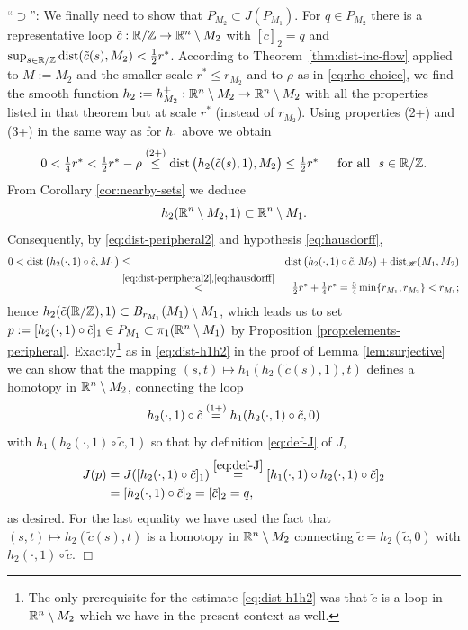 ``$\supset$'':
We finally need to show that $P_{M_2}\subset J(P_{M_1})$. For $q\in P_{M_2}$
there is a representative loop $\tilde{c}:\mathbb{R}/\mathbb{Z}\to\mathbb{R}^n\setminus M_2$ with
$[\tilde{c}]_2=q$ and $\sup_{s\in\mathbb{R}/\mathbb{Z}}\operatorname{dist}(\tilde{c}(s),M_2)<\frac12 r^*$.
According to Theorem~\ref{thm:dist-inc-flow} applied to $M:=M_2$ and
the smaller scale $r^*\le r_{M_2}$ and to %
$\rho$ as in \eqref{eq:rho-choice}, we find
the smooth function $h_2:=h_{M_2}^+:\mathbb{R}^n\setminus M_2\to\mathbb{R}^n\setminus M_2$ with 
all the properties listed in that theorem but
at scale $r^*$ (instead of $r_{M_2}$). Using properties (2+) and (3+)
in the same way as for $h_1$ above we obtain
\begin{equation}\label{eq:dist-peripheral2}
\textstyle
0<\frac14{r^*} <\frac12{r^*} -\rho\overset{\textnormal{(2+)}}{\le}
\operatorname{dist}\big(h_2(\tilde{c}(s),1),M_2\big)
\le\frac12{r^*}\quad\,\,\,\text{for all }\,\, s\in\mathbb{R}/\mathbb{Z}.
\end{equation}
From Corollary \ref{cor:nearby-sets} we deduce
\begin{equation}\label{eq:respect-complements4}
h_2(\mathbb{R}^n\setminus M_2,1)\subset\mathbb{R}^n\setminus M_1.
\end{equation}
Consequently,  by \eqref{eq:dist-peripheral2} and hypothesis \eqref{eq:hausdorff},
\begin{eqnarray*}
0<\operatorname{dist}\big(h_2(\cdot,1)\circ\tilde{c},M_1\big) & \le &
\operatorname{dist}\big(h_2(\cdot,1)\circ\tilde{c},M_2\big)+
\operatorname{dist}_{\mathscr{H}}(M_1,M_2)\\
& \overset{\eqref{eq:dist-peripheral2},\eqref{eq:hausdorff}}{<} &
\textstyle
\frac12{r^*}+\frac14{r^*}=\frac34 \min\{r_{M_1},r_{M_2}\}<r_{M_1};
\end{eqnarray*}
hence $h_2(\tilde{c}(\mathbb{R}/\mathbb{Z}),1)\subset B_{r_{M_1}}(M_1)\setminus M_1$, which leads
us to set $p:=[h_2(\cdot,1)\circ\tilde{c}]_1\in P_{M_1}\subset\pi_1(\mathbb{R}^n\setminus M_1)$
by Proposition \ref{prop:elements-peripheral}.
Exactly\footnote{The only prerequisite for the estimate \eqref{eq:dist-h1h2} was that
$\tilde{c}$ is a loop in $\mathbb{R}^n\setminus M_2$ which we have in the present
context as well.}
as in \eqref{eq:dist-h1h2} in the proof of Lemma \ref{lem:surjective}
we can show that the mapping $(s,t)\mapsto h_1(h_2(\tilde{c}(s),1),t)$ defines a homotopy in 
$\mathbb{R}^n\setminus M_2$,  
 connecting the loop 
$$
h_2(\cdot,1)\circ\tilde{c}\overset{\textnormal{(1+)}}{=}h_1(h_2(\cdot,1)\circ\tilde{c},0)
$$
with $h_1(h_2(\cdot,1)\circ\tilde{c},1)$ so that by definition \eqref{eq:def-J} of $J$,
\begin{align*}
J(p)& = J([h_2(\cdot,1)\circ\tilde{c}]_1)\overset{\eqref{eq:def-J}}{=}
[h_1(\cdot,1)\circ h_2(\cdot,1)\circ\tilde{c}]_2\\
& = [h_2(\cdot,1)\circ\tilde{c}]_2=[\tilde{c}]_2=q,
\end{align*}
as desired. For the last equality we have used the fact that
$(s,t)\mapsto h_2(\tilde{c}(s),t)$ is a homotopy in $\mathbb{R}^n\setminus M_2$
connecting $\tilde{c}=h_2(\tilde{c},0)$ with $h_2(\cdot,1)\circ\tilde{c}$.
\hfill $\Box$


